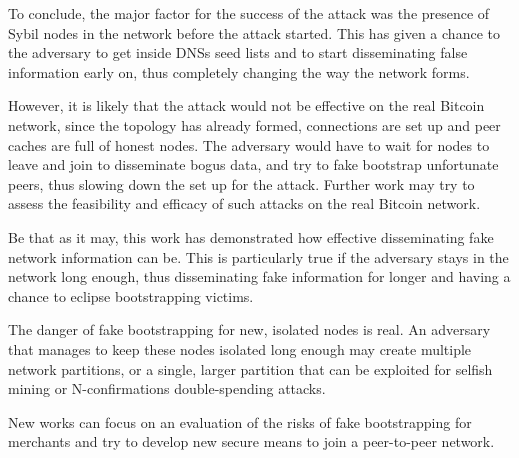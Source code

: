 To conclude, the major factor for the success of the attack was the presence of Sybil nodes in the network before the attack started. This has given a chance to the adversary to get inside DNSs seed lists and to start disseminating false information early on, thus completely changing the way the network forms.

However, it is likely that the attack would not be effective on the real Bitcoin network, since the topology has already formed, connections are set up and peer caches are full of honest nodes. The adversary would have to wait for nodes to leave and join to disseminate bogus data, and try to fake bootstrap unfortunate peers, thus slowing down the set up for the attack. Further work may try to assess the feasibility and efficacy of such attacks on the real Bitcoin network.

Be that as it may, this work has demonstrated how effective disseminating fake network information can be. This is particularly true if the adversary stays in the network long enough, thus disseminating fake information for longer and having a chance to eclipse bootstrapping victims.

The danger of fake bootstrapping for new, isolated nodes is real. An adversary that manages to keep these nodes isolated long enough may create multiple network partitions, or a single, larger partition that can be exploited for selfish mining or N-confirmations double-spending attacks.

New works can focus on an evaluation of the risks of fake bootstrapping for merchants and try to develop new secure means to join a peer-to-peer network. 
